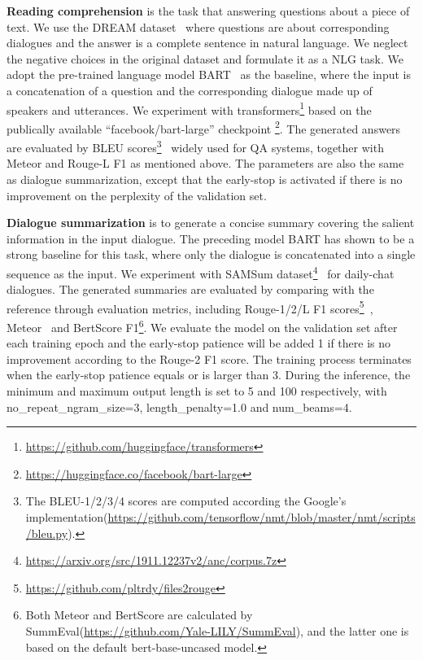 \textbf{Reading comprehension} is the task that answering questions about a piece of text. We use the DREAM dataset~\cite{sun2019dream} where questions are about corresponding dialogues and the answer is a complete sentence in natural language. We neglect the negative choices in the original dataset and formulate it as a NLG task. We adopt the pre-trained language model BART~\cite{lewis2020bart} as the baseline, where the input is a concatenation of a question and the corresponding dialogue made up of speakers and utterances. 
We experiment with  transformers\footnote{\url{https://github.com/huggingface/transformers}} based on the publically available ``facebook/bart-large'' checkpoint \footnote{\url{https://huggingface.co/facebook/bart-large}}.
The generated answers are evaluated by BLEU scores\footnote{The BLEU-1/2/3/4 scores are computed according the Google's implementation(\url{https://github.com/tensorflow/nmt/blob/master/nmt/scripts/bleu.py}).}~\cite{papineni2002bleu} widely used for QA systems, together with Meteor and Rouge-L F1 as mentioned above. The parameters are also the same as dialogue summarization, except that the early-stop is activated if there is no improvement on the perplexity of the validation set. 


\textbf{Dialogue summarization} is to generate a concise summary covering the salient information in the input dialogue. The preceding model BART has shown to be a strong baseline for this task, where only the dialogue is concatenated into a single sequence as the input. We experiment with  %
SAMSum dataset\footnote{\url{https://arxiv.org/src/1911.12237v2/anc/corpus.7z}}~\cite{gliwa2019samsum} for daily-chat dialogues. 
The generated summaries are evaluated by comparing with the reference through evaluation metrics, including Rouge-1/2/L F1 scores\footnote{\url{https://github.com/pltrdy/files2rouge}}~\cite{lin2004rouge}, Meteor~\cite{banerjee2005meteor} and BertScore F1\footnote{Both Meteor and BertScore are calculated by SummEval(\url{https://github.com/Yale-LILY/SummEval}), and the latter one is based on the default bert-base-uncased model.}. We evaluate the model on the validation set after each training epoch and the early-stop patience will be added 1 if there is no improvement according to the Rouge-2 F1 score. The training process terminates when the early-stop patience equals or is larger than 3.  During the inference, the minimum and maximum output length is set to 5 and 100 respectively, with no\_repeat\_ngram\_size=3, length\_penalty=1.0 and num\_beams=4.


